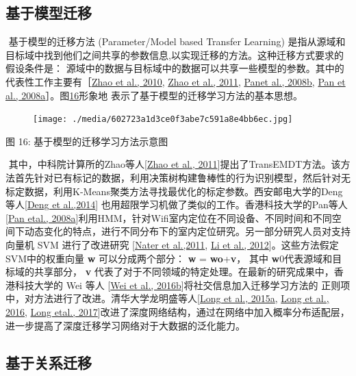 \subsection{基于模型迁移}\label{ux57faux4e8eux6a21ux578bux8fc1ux79fb}

​ 基于模型的迁移方法 (Parameter/Model based Transfer Learning)
是指从源域和目标域中找到他们之间共享的参数信息,以实现迁移的方法。这种迁移方式要求的假设条件是：
源域中的数据与目标域中的数据可以共享一些模型的参数。其中的代表性工作主要有［\protect\hyperlink{bookmark324}{Zhao
et al., 2010}, \protect\hyperlink{bookmark325}{Zhao et al., 2011},
\protect\hyperlink{bookmark287}{Panet al., 2008b},
\protect\hyperlink{bookmark286}{Pan et al.,
2008a}］。图\protect\hyperlink{bookmark96}{16}形象地
表示了基于模型的迁移学习方法的基本思想。

\begin{figure}
\centering
\texttt{[image: ./media/602723a1d3ce0f3abe7c591a8e4bb6ec.jpg]}
\caption{}
\end{figure}

图 16: 基于模型的迁移学习方法示意图

​ 其中，中科院计算所的Zhao等人{[}\protect\hyperlink{bookmark325}{Zhao et
al.,
2011}{]}提出了TransEMDT方法。该方法首先针对已有标记的数据，利用决策树构建鲁棒性的行为识别模型，然后针对无标定数据，利用K-Means聚类方法寻找最优化的标定参数。西安邮电大学的Deng等人{[}\protect\hyperlink{bookmark245}{Deng
et al.,2014}{]}
也用超限学习机做了类似的工作。香港科技大学的Pan等人{[}\protect\hyperlink{bookmark286}{Pan
etal.,
2008a}{]}利用HMM，针对Wifi室内定位在不同设备、不同时间和不同空间下动态变化的特点，进行不同分布下的室内定位研究。另一部分研究人员对支持向量机
SVM 进行了改进研究 {[}\protect\hyperlink{bookmark285}{Nater et
al.,2011}, \protect\hyperlink{bookmark269}{Li et al.,
2012}{]}。这些方法假定 SVM中的权重向量 \textbf{w} 可以分成两个部分：
\textbf{w} = \textbf{wo}+\textbf{v}， 其中
\textbf{w}0代表源域和目标域的共享部分， \textbf{v}
代表了对于不同领域的特定处理。在最新的研究成果中，香港科技大学的 Wei
等人 {[}\protect\hyperlink{bookmark313}{Wei et al.,
2016b}{]}将社交信息加入迁移学习方法的
正则项中，对方法进行了改进。清华大学龙明盛等人{[}\protect\hyperlink{bookmark275}{Long
et al., 2015a}, \protect\hyperlink{bookmark276}{Long et al., 2016},
\protect\hyperlink{bookmark280}{Long etal.,
2017}{]}改进了深度网络结构，通过在网络中加入概率分布适配层，进一步提高了深度迁移学习网络对于大数据的泛化能力。

\subsection{基于关系迁移}\label{ux57faux4e8eux5173ux7cfbux8fc1ux79fb}

